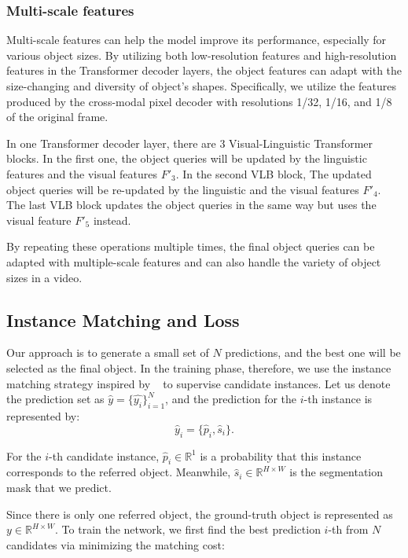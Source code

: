 \subsubsection{Multi-scale features}
Multi-scale features can help the model improve its performance, especially for various object sizes. By utilizing both low-resolution features and high-resolution features in the Transformer decoder layers, the object features can adapt with the size-changing and diversity of object's shapes. 
Specifically, we utilize the features produced by the cross-modal pixel decoder with resolutions 1/32, 1/16, and 1/8 of the original frame. 

In one Transformer decoder layer, there are 3 Visual-Linguistic Transformer blocks. In the first one, the object queries will be updated by the linguistic features and the visual features $F'_3$. In the second VLB block, The updated object queries will be re-updated by the linguistic and the visual features $F'_4$. The last VLB block updates the object queries in the same way but uses the visual feature $F'_5$ instead. 

By repeating these operations multiple times, the final object queries can be adapted with multiple-scale features and can also handle the variety of object sizes in a video. 


\subsection{Instance Matching and Loss}
\label{sec:instance_matching}
Our approach is to generate a small set of $N$ predictions, and the best one will be selected as the final object. In the training phase, therefore, we use the instance matching strategy inspired by ~\cite{cheng_masked-attention_2022, cheng_per-pixel_2021} to supervise candidate instances. 
Let us denote the prediction set as $\hat{y} = \{\hat{y_i}\}_{i = 1}^{N}$, and the prediction for the $i$-th instance is represented by:
\begin{equation}
    \hat{y}_i = \{\hat{p}_i, \hat{s}_i\}.
\end{equation}

For the $i$-th candidate instance, $\hat{p}_i \in \mathbb{R}^1$ is a probability that this instance corresponds to the referred object. Meanwhile, $\hat{s}_i \in \mathbb{R}^{H \times W}$ is the segmentation mask that we predict.

Since there is only one referred object, the ground-truth object is represented as $y \in \mathbb{R}^{H \times W}$. To train the network, we first find the best prediction $i$-th from $N$ candidates via minimizing the matching cost:


